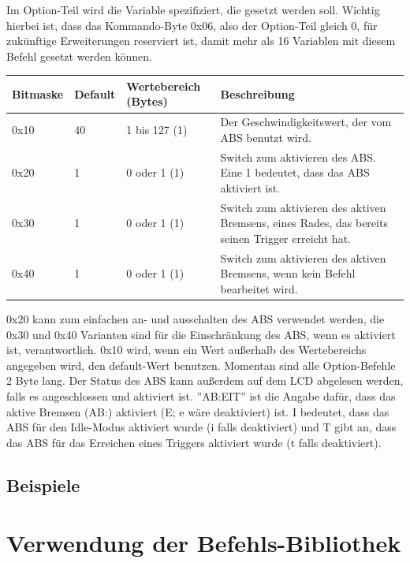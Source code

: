 \documentclass[a4paper]{article}
\begin{document}
	Im Option-Teil wird die Variable spezifiziert, die gesetzt werden soll.
	Wichtig hierbei ist, dass das Kommando-Byte 0x06, also der Option-Teil
	gleich 0, für zukünftige Erweiterungen reserviert ist, damit mehr als
	16 Variablen mit diesem Befehl gesetzt werden können.

	\begin{tabularx}{\linewidth}{|l|l|l|X|}
		\hline
		\textbf{Bitmaske} & \textbf{Default} & \textbf{Wertebereich (Bytes)} & \textbf{Beschreibung} \\
		\hline
		\hline
		0x10 & 40 & 1 bis 127 (1) & Der Geschwindigkeitswert, der vom ABS benutzt wird. \\
		\hline
		0x20 & 1 & 0 oder 1 (1) & Switch zum aktivieren des ABS. Eine 1 bedeutet, dass das ABS aktiviert ist. \\
		\hline
		0x30 & 1 & 0 oder 1 (1) & Switch zum aktivieren des aktiven Bremsens, eines Rades, das bereits seinen Trigger erreicht hat. \\
		\hline
		0x40 & 1 & 0 oder 1 (1) & Switch zum aktivieren des aktiven Bremsens, wenn kein Befehl bearbeitet wird. \\
		\hline
	\end{tabularx}

	0x20 kann zum einfachen an- und ausschalten des ABS verwendet werden,
	die 0x30 und 0x40 Varianten sind für die Einschränkung des ABS, wenn es
	aktiviert ist, verantwortlich. 0x10 wird, wenn ein Wert außerhalb des Wertebereichs
	angegeben wird, den default-Wert benutzen. Momentan sind alle Option-Befehle 2 Byte lang.
	Der Status des ABS kann außerdem auf dem LCD abgelesen werden, falls es angeschlossen
	und aktiviert ist. ''AB:EIT'' ist die Angabe dafür, dass das aktive Bremsen (AB:) aktiviert
	(E; e wäre deaktiviert) ist. I bedeutet, dass das ABS für den Idle-Modus aktiviert wurde
	(i falls deaktiviert) und T gibt an, dass das ABS für das Erreichen eines Triggers
	aktiviert wurde (t falls deaktiviert).

	\subsection{Beispiele}
	\pagebreak

	
	\section{Verwendung der Befehls-Bibliothek}
	
\end{document}
